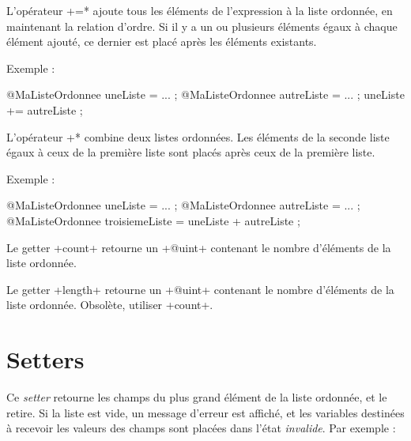 L'opérateur \ggs*+=* ajoute tous les éléments de l'expression à la liste ordonnée, en maintenant la relation d'ordre. Si il y a un ou plusieurs éléments égaux à chaque élément ajouté, ce dernier est placé après les éléments existants. 

Exemple :
\begin{galgas}
@MaListeOrdonnee uneListe = ... ;
@MaListeOrdonnee autreListe = ... ;
uneListe += autreListe ;
\end{galgas}


L'opérateur \ggs*+* combine deux listes ordonnées. Les éléments de la seconde liste égaux à ceux de la première liste sont placés après ceux de la première liste.

Exemple :
\begin{galgas}
@MaListeOrdonnee uneListe = ... ;
@MaListeOrdonnee autreListe = ... ;
@MaListeOrdonnee troisiemeListe = uneListe + autreListe ;
\end{galgas}








Le getter \ggs+count+ retourne un \ggs+@uint+ contenant le nombre d'éléments de la liste ordonnée.









Le getter \ggs+length+ retourne un \ggs+@uint+ contenant le nombre d'éléments de la liste ordonnée. Obsolète, utiliser \ggs+count+.






\section{Setters}


Ce \emph{setter} retourne les champs du plus grand élément de la liste ordonnée, et le retire. Si la liste est vide, un message d'erreur est affiché, et les variables destinées à recevoir les valeurs des champs sont placées dans l'état \emph{invalide}. Par exemple :

